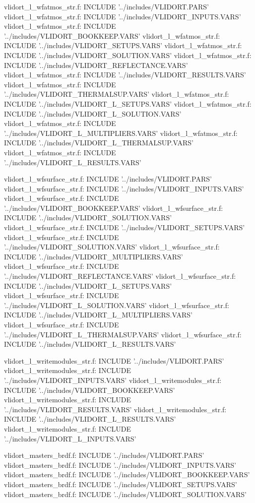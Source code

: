 vlidort_l_wfatmos_str.f:      INCLUDE '../includes/VLIDORT.PARS'
vlidort_l_wfatmos_str.f:      INCLUDE '../includes/VLIDORT_INPUTS.VARS'
vlidort_l_wfatmos_str.f:      INCLUDE '../includes/VLIDORT_BOOKKEEP.VARS'
vlidort_l_wfatmos_str.f:      INCLUDE '../includes/VLIDORT_SETUPS.VARS'
vlidort_l_wfatmos_str.f:      INCLUDE '../includes/VLIDORT_SOLUTION.VARS'
vlidort_l_wfatmos_str.f:      INCLUDE '../includes/VLIDORT_REFLECTANCE.VARS'
vlidort_l_wfatmos_str.f:      INCLUDE '../includes/VLIDORT_RESULTS.VARS'
vlidort_l_wfatmos_str.f:      INCLUDE '../includes/VLIDORT_THERMALSUP.VARS'
vlidort_l_wfatmos_str.f:      INCLUDE '../includes/VLIDORT_L_SETUPS.VARS'
vlidort_l_wfatmos_str.f:      INCLUDE '../includes/VLIDORT_L_SOLUTION.VARS'
vlidort_l_wfatmos_str.f:      INCLUDE '../includes/VLIDORT_L_MULTIPLIERS.VARS'
vlidort_l_wfatmos_str.f:      INCLUDE '../includes/VLIDORT_L_THERMALSUP.VARS'
vlidort_l_wfatmos_str.f:      INCLUDE '../includes/VLIDORT_L_RESULTS.VARS'

vlidort_l_wfsurface_str.f:      INCLUDE '../includes/VLIDORT.PARS'
vlidort_l_wfsurface_str.f:      INCLUDE '../includes/VLIDORT_INPUTS.VARS'
vlidort_l_wfsurface_str.f:      INCLUDE '../includes/VLIDORT_BOOKKEEP.VARS'
vlidort_l_wfsurface_str.f:      INCLUDE '../includes/VLIDORT_SOLUTION.VARS'
vlidort_l_wfsurface_str.f:      INCLUDE '../includes/VLIDORT_SETUPS.VARS'
vlidort_l_wfsurface_str.f:      INCLUDE '../includes/VLIDORT_SOLUTION.VARS'
vlidort_l_wfsurface_str.f:      INCLUDE '../includes/VLIDORT_MULTIPLIERS.VARS'
vlidort_l_wfsurface_str.f:      INCLUDE '../includes/VLIDORT_REFLECTANCE.VARS'
vlidort_l_wfsurface_str.f:      INCLUDE '../includes/VLIDORT_L_SETUPS.VARS'
vlidort_l_wfsurface_str.f:      INCLUDE '../includes/VLIDORT_L_SOLUTION.VARS'
vlidort_l_wfsurface_str.f:      INCLUDE '../includes/VLIDORT_L_MULTIPLIERS.VARS'
vlidort_l_wfsurface_str.f:      INCLUDE '../includes/VLIDORT_L_THERMALSUP.VARS'
vlidort_l_wfsurface_str.f:      INCLUDE '../includes/VLIDORT_L_RESULTS.VARS'

vlidort_l_writemodules_str.f:      INCLUDE '../includes/VLIDORT.PARS'
vlidort_l_writemodules_str.f:      INCLUDE '../includes/VLIDORT_INPUTS.VARS'
vlidort_l_writemodules_str.f:      INCLUDE '../includes/VLIDORT_BOOKKEEP.VARS'
vlidort_l_writemodules_str.f:      INCLUDE '../includes/VLIDORT_RESULTS.VARS'
vlidort_l_writemodules_str.f:      INCLUDE '../includes/VLIDORT_L_RESULTS.VARS'
vlidort_l_writemodules_str.f:      INCLUDE '../includes/VLIDORT_L_INPUTS.VARS'

vlidort_masters_brdf.f:      INCLUDE '../includes/VLIDORT.PARS'
vlidort_masters_brdf.f:      INCLUDE '../includes/VLIDORT_INPUTS.VARS'
vlidort_masters_brdf.f:      INCLUDE '../includes/VLIDORT_BOOKKEEP.VARS'
vlidort_masters_brdf.f:      INCLUDE '../includes/VLIDORT_SETUPS.VARS'
vlidort_masters_brdf.f:      INCLUDE '../includes/VLIDORT_SOLUTION.VARS'

